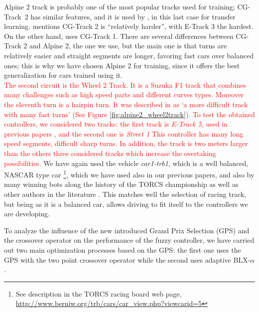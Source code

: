 \documentclass[10pt,journal,compsoc]{IEEEtran}
\begin{document}
Alpine 2 track is probably one of the most popular tracks used for
training; \mbox{CG-Track 2} has similar features, and it is used by
\cite{mirus2019short,8833873,verma2018programmatically},
in this last case for transfer learning. \cite{Kole-ParamCarTunning12}
mentions CG-Track 2 is ``relatively harder'', with E-Track 3 the
hardest. On the other hand, \cite{10.1371/journal.pone.0213193} uses
CG-Track 1. There are several differences between CG-Track 2 and Alpine
2, the one we use, but the main one is that turns are relatively
easier and straight segments are longer, favoring fast cars over
balanced ones; this is why we have chosen Alpine 2 for training, since
it offers the best generalization for cars trained using it.\\
\textcolor{red}{
The second circuit is the Wheel 2 Track. It is a  Suzuka F1 track that combines many challenges such as high speed parts and different curves types. Moreover the eleventh turn is a hairpin turn. It was  described in \cite{wheel2track_chen} as `a more difficult track with many fast turns' (See Figure \ref{fig:alpine2_wheel2track}).
To test the obtained controllers, we considered two tracks: the first track is \textit{E-Track 5}, used in previous papers \cite{salem_evo17},\cite{salem_evo17} and the second one is \textit{Street 1}
This controller has many long speed segments, difficult sharp turns. In addition, the track is two meters larger than the others  three considered tracks which increase the overtaking possibilities.
}
We have again used the vehicle \textit{car1-trb1},
which is a well balanced, NASCAR type car \footnote{See description in
  the TORCS racing board web page,
  \url{http://www.berniw.org/trb/cars/car_view.php?viewcarid=5}},
which we have used also in our previous papers, and also by many
winning bots along the history of the TORCS championship
\cite{torcs5} as well as other authors in the literature
\cite{auteur2010,li2019reinforcement}. This matches well the selection
of racing track, but being as it is a balanced car, allows driving to
fit itself to the controllers we are developing.



To analyze the influence of the new introduced Grand Prix Selection
(GPS) and the crossover operator on the performance of the fuzzy
controller, we have carried out two main optimization processes based
on the GPS: the first one uses the GPS with the two point crossover
operator while the second uses adaptive BLX-$\alpha$.
\end{document}
